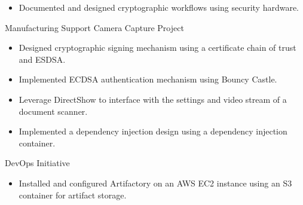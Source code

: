 \begin{cventries}
{\begin{cvitems}
{\begin{itemize}
        \item Documented and designed cryptographic workflows using security hardware.
      \end{itemize} 
    }
    \item
    {
      {Manufacturing Support Camera Capture Project}
      \begin{itemize}
        \item Designed cryptographic signing mechanism using a certificate chain of trust and ESDSA.
        \item Implemented ECDSA authentication mechanism using Bouncy Castle.
        \item Leverage DirectShow to interface with the settings and video stream of a document scanner.
        \item Implemented a dependency injection design using a dependency injection container.
      \end{itemize}
    }
    \item
    {
      {DevOps Initiative}
      \begin{itemize}
        \item Installed and configured Artifactory on an AWS EC2 instance using an S3 container for artifact storage.
      \end{itemize}
    }
    \end{cvitems}
  }

\end{cventries}
